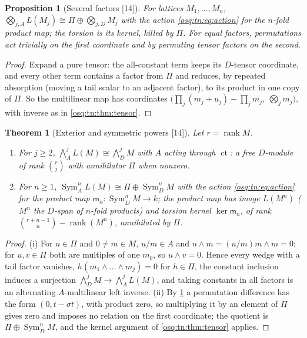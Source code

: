 \documentclass[11pt,letterpaper]{article}
\numberwithin{equation}{section}
\newtheorem{theorem}{Theorem}[section]
\newtheorem{proposition}[proposition]{Proposition}
\theoremstyle{definition}
\theoremstyle{remark}
\theoremstyle{plain}
\newcommand{\ct}{\operatorname{ct}}
\newcommand{\rk}{\operatorname{rank}}
\newcommand{\src}[1]{\textup{\textsf{[#1]}}}
\begin{document}
\begin{proposition}[Several factors \src{14}]\label{osq:tn:prop:higher}
For lattices $M_1,\dots,M_n$, $\bigotimes_{j,A}L(M_j)\cong\Pi\oplus\bigotimes_{j,D}M_j$ with the action \eqref{osq:tn:eq:action} for
the $n$-fold product map; the torsion is its kernel, killed by $\Pi$. For equal factors, permutations act trivially on the first
coordinate and by permuting tensor factors on the second.
\end{proposition}
\begin{proof}
Expand a pure tensor: the all-constant term keeps its $D$-tensor coordinate, and every other term contains a factor from $\Pi$ and
reduces, by repeated absorption (moving a tail scalar to an adjacent factor), to its product in one copy of $\Pi$. So the multilinear
map has coordinates $\bigl(\prod_j(m_j+u_j)-\prod_jm_j,\ \bigotimes_jm_j\bigr)$, with inverse as in \cref{osq:tn:thm:tensor}.
\end{proof}

\begin{theorem}[Exterior and symmetric powers \src{14}]\label{osq:tn:thm:powers}
Let $r=\rk M$.
\begin{enumerate}
\item For $j\ge2$, $\bigwedge^j_AL(M)\cong\bigwedge^j_DM$ with $A$ acting through $\ct$: a free $D$-module of rank $\binom rj$ with
annihilator $\Pi$ when nonzero.
\item For $n\ge1$, $\operatorname{Sym}^n_AL(M)\cong\Pi\oplus\operatorname{Sym}^n_DM$ with the action \eqref{osq:tn:eq:action} for the
product map $\mathsf m_n:\operatorname{Sym}^n_DM\to k$; the product map has image $L(M^n)$ ($M^n$ the $D$-span of $n$-fold products) and
torsion kernel $\ker\mathsf m_n$, of rank $\binom{r+n-1}n-\rk(M^n)$, annihilated by $\Pi$.
\end{enumerate}
\end{theorem}
\begin{proof}
(i) For $u\in\Pi$ and $0\ne m\in M$, $u/m\in A$ and $u\wedge m=(u/m)m\wedge m=0$; for $u,v\in\Pi$ both are multiples of one
$m_0$, so $u\wedge v=0$. Hence every wedge with a tail factor vanishes, $h(m_1\wedge\dots\wedge m_j)=0$ for $h\in\Pi$, the constant
inclusion induces a surjection $\bigwedge^j_DM\to\bigwedge^j_AL(M)$, and taking constants in all factors is an alternating
$A$-multilinear left inverse. (ii) By \cref{osq:tn:prop:higher} a permutation difference has the form $(0,t-\sigma t)$, with product
zero, so multiplying it by an element of $\Pi$ gives zero and imposes no relation on the first coordinate; the quotient is
$\Pi\oplus\operatorname{Sym}^n_DM$, and the kernel argument of \cref{osq:tn:thm:tensor} applies.
\end{proof}
\end{document}

